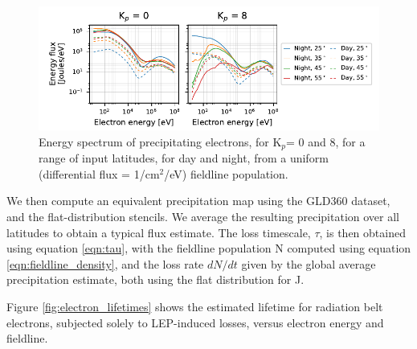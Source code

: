 \begin{figure}[]
\begin{center}
\includegraphics{figures/stencil_energy_spectrum_flat_distribution.pdf}
\caption[Energy spectrum of LEP stencils, drawn from a uniform radiation belt population]{Energy spectrum of precipitating electrons, for K$_p$= 0 and 8, for a range of input latitudes, for day and night, from a uniform (differential flux = 1/cm$^2$/eV) fieldline population.}
\label{fig:stencil_energy_spectrum_flat_distribution}
\end{center}
\end{figure}

We then compute an equivalent precipitation map using the GLD360 dataset, and the flat-distribution stencils. We average the resulting precipitation over all latitudes to obtain a typical flux estimate. The loss timescale, $\tau$, is then obtained using equation \eqref{eqn:tau}, with the fieldline population N computed using equation \eqref{eqn:fieldline_density}, and the loss rate $dN/dt$ given by the global average precipitation estimate, both using the flat distribution for J.

Figure \ref{fig:electron_lifetimes} shows the estimated lifetime for radiation belt electrons, subjected solely to LEP-induced losses, versus electron energy and fieldline. 

